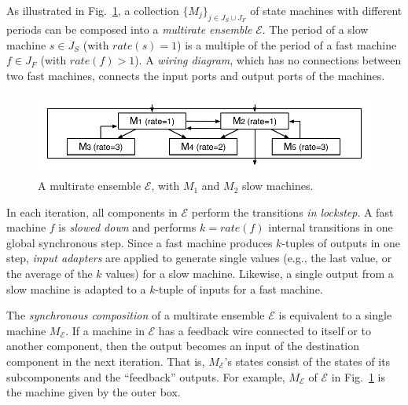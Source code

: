 As illustrated in Fig.~\ref{fig:ensemble},
a collection $\{M_j\}_{j\in J_S\cup J_F}$ of  state machines with different periods 
can be composed into a 
\emph{multirate ensemble} $\mathcal{E}$.
The period of a slow machine $s \in J_S$ (with $\mathit{rate}(s) = 1$) is 
a multiple of the period of a fast machine $f \in J_F$ (with $\mathit{rate}(f) > 1$). 
A \emph{wiring diagram}, which has no connections between two fast
machines,  connects the  input ports and output ports of the machines.

\begin{figure}
\centering
\includegraphics[clip=true,trim=0.3cm 0.4cm 0.3cm 0.4cm,width=\columnwidth]{ensemble.pdf}    
\caption{A multirate ensemble $\mathcal{E}$,
with $M_1$ and $M_2$ slow machines.
}  \label{fig:ensemble}
\end{figure}

In each iteration, all components in $\mathcal{E}$ perform the transitions \emph{in lockstep}.
A fast machine $f$ is \emph{slowed down} 
and performs $k = \mathit{rate}(f)$ internal transitions  in one global synchronous step.
Since 
a fast machine produces $k$-tuples of outputs in one step, 
\emph{input adapters} are applied 
to generate single values (e.g., the last value, or 
the average of the $k$ values) for a slow machine. 
Likewise, a single output  from a slow machine is adapted to a $k$-tuple of inputs 
for a fast machine.




The \emph{synchronous composition}  of a multirate ensemble $\mathcal{E}$
is equivalent to a single machine $M_\mathcal{E}$.
If a machine in $\mathcal{E}$ has a feedback wire connected to itself or to another component, then the output becomes an input of the destination component in the next iteration.
That is,  $M_\mathcal{E}$'s states %
consist of the states %
of its subcomponents %
and
the   ``feedback'' outputs. %
For example, 
$M_\mathcal{E}$ of 
$\mathcal{E}$ in Fig.~\ref{fig:ensemble} 
is the machine given by the outer box. 

